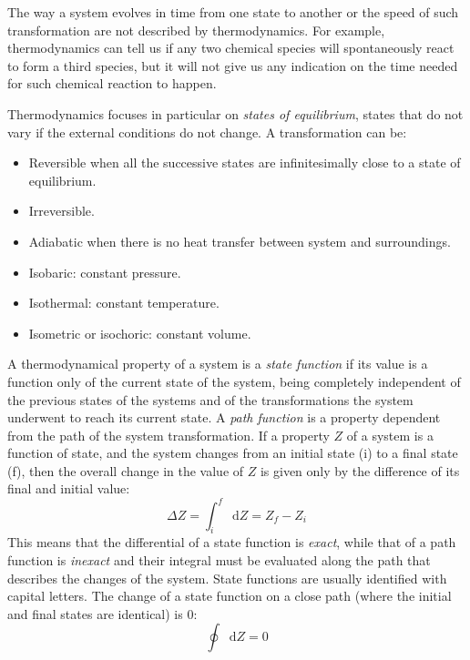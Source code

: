 \documentclass[12pt,a4paper]{report}
\newcommand*\diff{\mathop{}\!\mathrm{d}}
\begin{document}
   The way a system evolves in time from one state to another or the speed of such transformation are not described by thermodynamics. For example, thermodynamics can tell us if any two chemical species will spontaneously react to form a third species, but it will not give us any indication on the time needed for such chemical reaction to happen.
   
   Thermodynamics focuses in particular on \textit{states of equilibrium}, states that do not vary if the external conditions do not change.
   A transformation can be:
   \begin{itemize}
   \item Reversible when all the successive states are infinitesimally close to a state of equilibrium.
   \item Irreversible. 
   \item Adiabatic when there is no heat transfer between system and surroundings.
   \item Isobaric: constant pressure.
   \item Isothermal: constant temperature.
   \item Isometric or isochoric: constant volume.
   \end{itemize}

   A thermodynamical property of a system is a \textit{state function} if its value is a function only of the current state of the system, being completely independent of the previous states of the systems and of the transformations the system underwent to reach its current state. A \textit{path function} is a property dependent from the path of the system transformation.
   If a property $Z$ of a system is a function of state, and the system changes from an initial state (i) to a final state (f), then the overall change in the value of $Z$ is given only by the difference of its final and initial value: 
   \begin{equation*}
   \Delta Z = \int_{i}^{f}\diff Z = Z_{f}-Z_{i}
   \end{equation*}
This means that the differential of a state function is \textit{exact}, while that of a path function is \textit{inexact} and their integral must be evaluated along the path that describes the changes of the system. State functions are usually identified with capital letters.
The change of a state function on a close path (where the initial and final states are identical) is 0:
   \begin{equation*}
   \oint\diff Z = 0
   \end{equation*}
\end{document}
